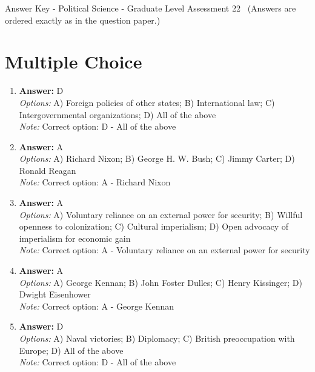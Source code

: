 \documentclass[12pt]{article}
\begin{document}
\begin{center}
Answer Key - Political Science - Graduate Level Assessment 22 \
\small (Answers are ordered exactly as in the question paper.)
\end{center}

\section*{Multiple Choice}
\begin{enumerate}[label=\arabic*.]
\item \textbf{Answer:} D
\\ \textit{Options:} A) Foreign policies of other states; B) International law; C) Intergovernmental organizations; D) All of the above
\\ \textit{Note:} Correct option: D - All of the above
\item \textbf{Answer:} A
\\ \textit{Options:} A) Richard Nixon; B) George H. W. Bush; C) Jimmy Carter; D) Ronald Reagan
\\ \textit{Note:} Correct option: A - Richard Nixon
\item \textbf{Answer:} A
\\ \textit{Options:} A) Voluntary reliance on an external power for security; B) Willful openness to colonization; C) Cultural imperialism; D) Open advocacy of imperialism for economic gain
\\ \textit{Note:} Correct option: A - Voluntary reliance on an external power for security
\item \textbf{Answer:} A
\\ \textit{Options:} A) George Kennan; B) John Foster Dulles; C) Henry Kissinger; D) Dwight Eisenhower
\\ \textit{Note:} Correct option: A - George Kennan
\item \textbf{Answer:} D
\\ \textit{Options:} A) Naval victories; B) Diplomacy; C) British preoccupation with Europe; D) All of the above
\\ \textit{Note:} Correct option: D - All of the above
\end{enumerate}
\end{document}
